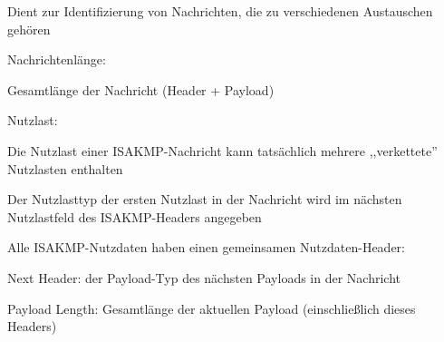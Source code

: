 \documentclass[a4paper]{article}
\begin{document}
\begin{multicols}{3}
\begin{itemize*}
            \begin{itemize*}
                  \item Dient zur Identifizierung von Nachrichten, die zu verschiedenen Austauschen gehören
            \end{itemize*}
            \item Nachrichtenlänge:
            \begin{itemize*}
                  \item Gesamtlänge der Nachricht (Header + Payload)
            \end{itemize*}
            \item Nutzlast:
            \begin{itemize*}
                  \item Die Nutzlast einer ISAKMP-Nachricht kann tatsächlich mehrere ,,verkettete'' Nutzlasten enthalten
                  \item Der Nutzlasttyp der ersten Nutzlast in der Nachricht wird im nächsten Nutzlastfeld des ISAKMP-Headers angegeben
                  \item Alle ISAKMP-Nutzdaten haben einen gemeinsamen Nutzdaten-Header:
                  \begin{itemize*}
                        \item Next Header: der Payload-Typ des nächsten Payloads in der Nachricht
                        \item Payload Length: Gesamtlänge der aktuellen Payload (einschließlich dieses Headers)
                  \end{itemize*}
            \end{itemize*}
      \end{itemize*}



\end{multicols}
\end{document}
